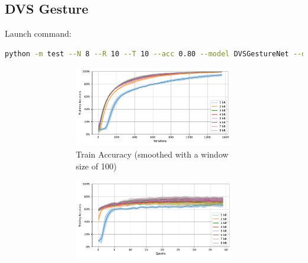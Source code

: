     \subsection{DVS Gesture}
    \label{appendix:accuracy_curves_dvs_gesture}
        Launch command: 
        \begin{lstlisting}[language=Bash, basicstyle=\small, breaklines=true]
python -m test --N 8 --R 10 --T 10 --acc 0.80 --model DVSGestureNet --data-path /scratch/zyi/codeSpace/data --dataset DVSGesture --batch-size 128 --opt adam --lr 1e-3 --lr-scheduler cosa --epochs 20 --lr-warmup-epochs 0 --output-dir /scratch/zyi/codeSpace/MultibitSpikes
        \end{lstlisting}

        \begin{figure}[H]
            \centering
            \begin{subfigure}[H]{0.69\textwidth}
                \centering
                \begin{subfigure}[H]{\textwidth}
                    \centering
                    \includegraphics[width=\textwidth]{../standard/DVSGesture/plots/dvsgesture_train_acc.pdf}
                    \caption{Train Accuracy (smoothed with a window size of 100)}
                \end{subfigure}
                \hfill
                \begin{subfigure}[H]{\textwidth}
                    \centering
                    \includegraphics[width=\textwidth]{../standard/DVSGesture/plots/dvsgesture_test_acc.pdf}

\end{subfigure}
\end{subfigure}
\end{figure}
